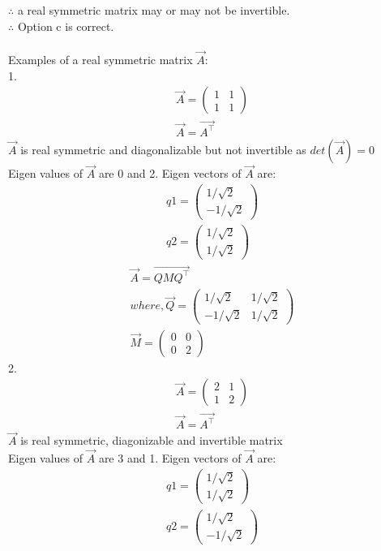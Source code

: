 \documentclass[journal]{IEEEtran}
\begin{document}
$\therefore$ a real symmetric matrix may or may not be invertible.\\
$\therefore$ Option c is correct.\\\\
Examples of a real symmetric matrix $\vec{A}$:\\
1.
\begin{align}
    \vec{A}=\begin{pmatrix}
        1 & 1\\1& 1
    \end{pmatrix}\\
    \vec{A}=\vec{A^\top}
\end{align}
$\vec{A}$ is real symmetric and diagonalizable but not invertible as $det(\vec{A})=0$\\
Eigen values of $\vec{A}$ are 0 and 2.
Eigen vectors of $\vec{A}$ are:
\begin{align}
    q1=\begin{pmatrix}
        1/\sqrt2\\-1/\sqrt2
    \end{pmatrix}\\
    q2=\begin{pmatrix}
        1/\sqrt2\\1/\sqrt2
    \end{pmatrix}
\end{align}
\begin{align}
    \vec{A}=\vec{QMQ^\top}\\
    where, \vec{Q}=\begin{pmatrix}
        1/\sqrt2 & 1/\sqrt2\\-1/\sqrt2 &1/\sqrt2
    \end{pmatrix}\\
    \vec{M}=\begin{pmatrix}
        0&0\\0&2
    \end{pmatrix}
\end{align}
2.
\begin{align}
    \vec{A}=\begin{pmatrix}
        2 & 1\\1& 2
    \end{pmatrix}\\
    \vec{A}=\vec{A^\top}
\end{align}
$\vec{A}$ is real symmetric, diagonizable and invertible matrix\\
Eigen values of $\vec{A}$ are 3 and 1.
Eigen vectors of $\vec{A}$ are:
\begin{align}
    q1=\begin{pmatrix}
        1/\sqrt2\\1/\sqrt2
    \end{pmatrix}\\
    q2=\begin{pmatrix}
        1/\sqrt2\\-1/\sqrt2
    \end{pmatrix}
\end{align}
\end{document}
